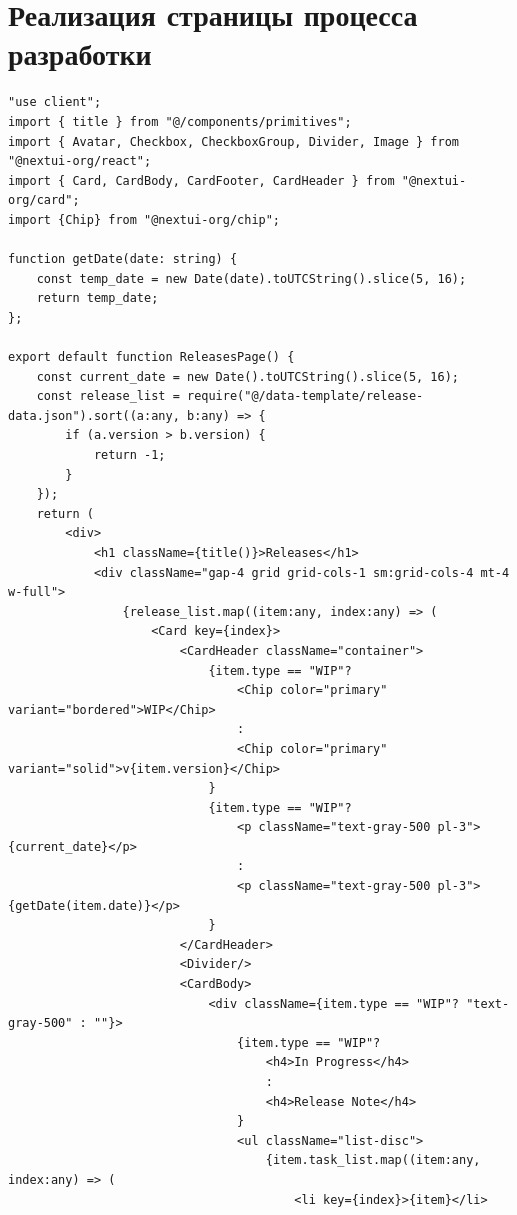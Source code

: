 \documentclass[master, och, diploma]{SCWorks}
\begin{document}
\section{Реализация страницы процесса разработки}
\begin{verbatim}
"use client";
import { title } from "@/components/primitives";
import { Avatar, Checkbox, CheckboxGroup, Divider, Image } from "@nextui-org/react";
import { Card, CardBody, CardFooter, CardHeader } from "@nextui-org/card";
import {Chip} from "@nextui-org/chip";

function getDate(date: string) {
    const temp_date = new Date(date).toUTCString().slice(5, 16);
    return temp_date;
};

export default function ReleasesPage() {
    const current_date = new Date().toUTCString().slice(5, 16);
    const release_list = require("@/data-template/release-data.json").sort((a:any, b:any) => {
        if (a.version > b.version) {
            return -1;
        }
    });
    return (
        <div>
            <h1 className={title()}>Releases</h1>
            <div className="gap-4 grid grid-cols-1 sm:grid-cols-4 mt-4 w-full">
                {release_list.map((item:any, index:any) => (
                    <Card key={index}>
                        <CardHeader className="container">
                            {item.type == "WIP"?
                                <Chip color="primary" variant="bordered">WIP</Chip>
                                :
                                <Chip color="primary" variant="solid">v{item.version}</Chip>
                            }
                            {item.type == "WIP"?
                                <p className="text-gray-500 pl-3">{current_date}</p>
                                :
                                <p className="text-gray-500 pl-3">{getDate(item.date)}</p>
                            }
                        </CardHeader>
                        <Divider/>
                        <CardBody>
                            <div className={item.type == "WIP"? "text-gray-500" : ""}>
                                {item.type == "WIP"?
                                    <h4>In Progress</h4>
                                    :
                                    <h4>Release Note</h4>
                                }
                                <ul className="list-disc">
                                    {item.task_list.map((item:any, index:any) => (
                                        <li key={index}>{item}</li>

\end{verbatim}
\end{document}
